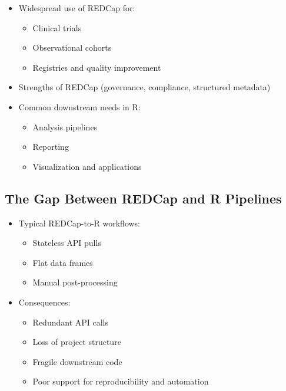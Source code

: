 \begin{itemize}
\tightlist
\item
  Widespread use of REDCap for:

  \begin{itemize}
  \tightlist
  \item
    Clinical trials\\
  \item
    Observational cohorts\\
  \item
    Registries and quality improvement\\
  \end{itemize}
\item
  Strengths of REDCap (governance, compliance, structured metadata)\\
\item
  Common downstream needs in R:

  \begin{itemize}
  \tightlist
  \item
    Analysis pipelines\\
  \item
    Reporting\\
  \item
    Visualization and applications
  \end{itemize}
\end{itemize}

\subsection{The Gap Between REDCap and R Pipelines}\label{the-gap-between-redcap-and-r-pipelines}

\begin{itemize}
\tightlist
\item
  Typical REDCap-to-R workflows:

  \begin{itemize}
  \tightlist
  \item
    Stateless API pulls
  \item
    Flat data frames
  \item
    Manual post-processing
  \end{itemize}
\item
  Consequences:

  \begin{itemize}
  \tightlist
  \item
    Redundant API calls\\
  \item
    Loss of project structure\\
  \item
    Fragile downstream code\\
  \item
    Poor support for reproducibility and automation
  \end{itemize}
\end{itemize}

